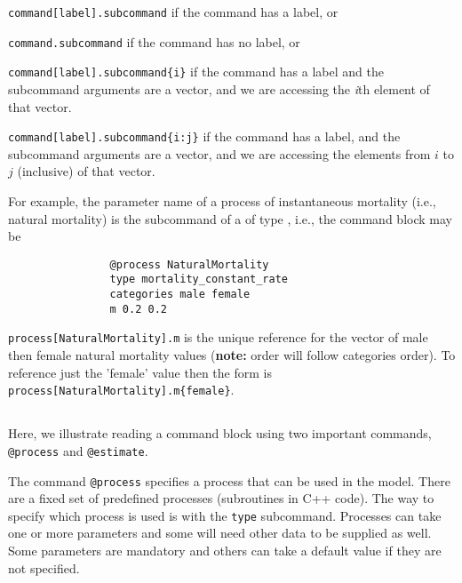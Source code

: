 \begin{description}
	\item \texttt{command[label].subcommand} if the command has a label, or
	\item \texttt{command.subcommand} if the command has no label, or
	\item \texttt{command[label].subcommand\{i\}} if the command has a label and the subcommand arguments are a vector, and we are accessing the  \emph{i}th element of that vector.
	\item \texttt{command[label].subcommand\{i:j\}} if the command has a label, and the subcommand arguments are a vector, and we are accessing the elements from $i$ to $j$ (inclusive) of that vector.
\end{description}

For example, the parameter name of a process of instantaneous mortality (i.e., natural mortality) is the subcommand  of a  of type , i.e., the command block may be

\small{\begin{verbatim}
				@process NaturalMortality
				type mortality_constant_rate
				categories male female
				m 0.2 0.2
\end{verbatim}}
%
\texttt{process[NaturalMortality].m} is the unique reference for the vector of male then female natural mortality values (\textbf{note:} order will follow categories order). To reference just the 'female' value then the form is
\texttt{process[NaturalMortality].m\{female\}}.

\subsection{\label{sec:Readingcommandblock}}

Here, we illustrate reading a command block using two important commands, \texttt{@process} and \texttt{@estimate}.

The command \texttt{@process} specifies a process that can be used in the model. There are a fixed set of predefined processes (subroutines in C++ code). The way to specify which process is used is with the \texttt{type} subcommand. Processes can take one or more parameters and some will need other data to be supplied as well. Some parameters are mandatory and others can take a default value if they are not specified.

